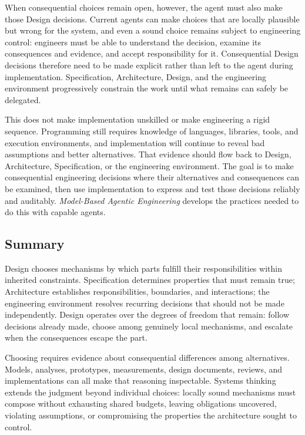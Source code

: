 When consequential choices remain open, however, the agent must also make those Design decisions.
Current agents can make choices that are locally plausible but wrong for the system, and even a sound choice remains subject to engineering control: engineers must be able to understand the decision, examine its consequences and evidence, and accept responsibility for it.
Consequential Design decisions therefore need to be made explicit rather than left to the agent during implementation.
Specification, Architecture, Design, and the engineering environment progressively constrain the work until what remains can safely be delegated.

This does not make implementation unskilled or make engineering a rigid sequence.
Programming still requires knowledge of languages, libraries, tools, and execution environments, and implementation will continue to reveal bad assumptions and better alternatives.
That evidence should flow back to Design, Architecture, Specification, or the engineering environment.
The goal is to make consequential engineering decisions where their alternatives and consequences can be examined, then use implementation to express and test those decisions reliably and auditably.
\emph{Model-Based Agentic Engineering} develops the practices needed to do this with capable agents.

\subsection{Summary}\label{summary}

Design chooses mechanisms by which parts fulfill their responsibilities within inherited constraints.
Specification determines properties that must remain true; Architecture establishes responsibilities, boundaries, and interactions; the engineering environment resolves recurring decisions that should not be made independently.
Design operates over the degrees of freedom that remain: follow decisions already made, choose among genuinely local mechanisms, and escalate when the consequences escape the part.

Choosing requires evidence about consequential differences among alternatives.
Models, analyses, prototypes, measurements, design documents, reviews, and implementations can all make that reasoning inspectable.
Systems thinking extends the judgment beyond individual choices: locally sound mechanisms must compose without exhausting shared budgets, leaving obligations uncovered, violating assumptions, or compromising the properties the architecture sought to control.

